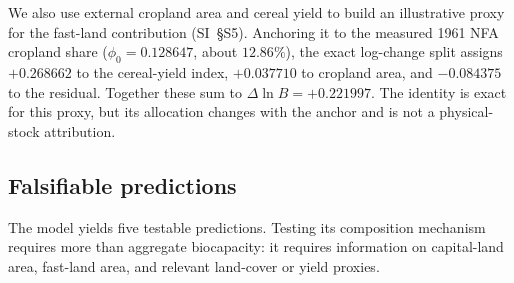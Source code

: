 \documentclass[preprint,12pt,authoryear]{elsarticle}
\begin{document}
We also use external cropland area and cereal yield to build an illustrative proxy for the fast-land contribution (SI~\S S5). Anchoring it to the measured 1961 NFA cropland share ($\phi_0=0.128647$, about $12.86\%$), the exact log-change split assigns $+0.268662$ to the cereal-yield index, $+0.037710$ to cropland area, and $-0.084375$ to the residual. Together these sum to $\Delta\ln B=+0.221997$. The identity is exact for this proxy, but its allocation changes with the anchor and is not a physical-stock attribution.

\subsection{Falsifiable predictions}\label{sec:predictions}

The model yields five testable predictions. Testing its composition mechanism requires more than aggregate biocapacity: it requires information on capital-land area, fast-land area, and relevant land-cover or yield proxies.
\end{document}

